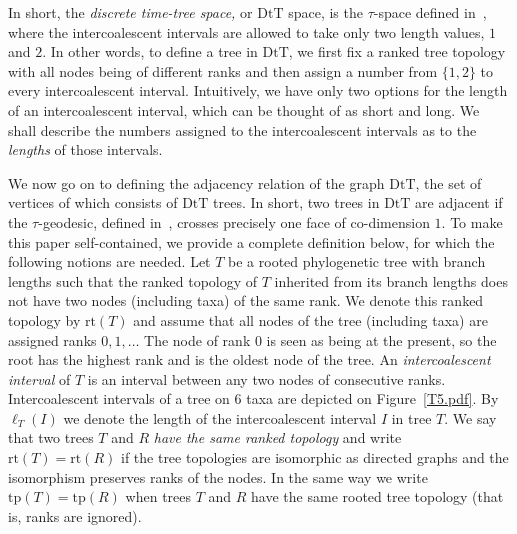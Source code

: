 \documentclass{amsart}
\newcommand{\dts}{\mathrm{DtT}}
\newcommand{\rt}{\mathrm{rt}}
\newcommand{\tp}{\mathrm{tp}}
\begin{document}

In short, the {\em discrete time-tree space,} or $\dts$ space, is the $\tau$-space defined in~\cite{Gavryushkin2014-bw}, where the intercoalescent intervals are allowed to take only two length values, $1$ and $2$.
In other words, to define a tree in $\dts$, we first fix a ranked tree topology with all nodes being of different ranks and then assign a number from $\{1,2\}$ to every intercoalescent interval.
Intuitively, we have only two options for the length of an intercoalescent interval, which can be thought of as short and long.
We shall describe the numbers assigned to the intercoalescent intervals as to the {\em lengths} of those intervals.

We now go on to defining the adjacency relation of the graph $\dts$, the set of vertices of which consists of $\dts$ trees.
In short, two trees in $\dts$ are adjacent if the $\tau$-geodesic, defined in~\cite{Gavryushkin2014-bw}, crosses precisely one face of co-dimension $1$.
To make this paper self-contained, we provide a complete definition below, for which the following notions are needed.
Let $T$ be a rooted phylogenetic tree with branch lengths such that the ranked topology of $T$ inherited from its branch lengths does not have two nodes (including taxa) of the same rank.
We denote this ranked topology by $\rt(T)$ and assume that all nodes of the tree (including taxa) are assigned ranks $0,1,\ldots$
The node of rank $0$ is seen as being at the present, so the root has the highest rank and is the oldest node of the tree.
An {\em intercoalescent interval} of $T$ is an interval between any two nodes of consecutive ranks.
Intercoalescent intervals of a tree on $6$ taxa are depicted on Figure~\ref{T5.pdf}.
By $\ell_T(I)$ we denote the length of the intercoalescent interval $I$ in tree $T$.
We say that two trees $T$ and $R$ {\em have the same ranked topology} and write $\rt(T) = \rt(R)$ if the tree topologies are isomorphic as directed graphs and the isomorphism preserves ranks of the nodes.
In the same way we write $\tp(T) = \tp(R)$ when trees $T$ and $R$ have the same rooted tree topology (that is, ranks are ignored).
\end{document}
